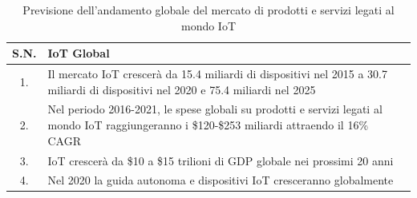 \begin{table}
	\begin{center}
	\begin{tabular}{|c|m{8cm}|}
		\hline
		\textbf{S.N.} & \textbf{IoT Global} \\
		\hline
		1. & Il mercato IoT crescerà da 15.4 miliardi di dispositivi nel 2015 a 30.7 miliardi di dispositivi nel 2020 e 75.4 miliardi nel 2025 \\
		\hline
		2. & Nel periodo 2016-2021, le spese globali su prodotti e servizi legati al mondo IoT raggiungeranno i \$120-\$253 miliardi attraendo il 16\% CAGR \\
		\hline
		3. & IoT crescerà da \$10 a \$15 trilioni di GDP globale nei prossimi 20 anni \\
		\hline
		4. & Nel 2020 la guida autonoma e dispositivi IoT cresceranno globalmente \\
		\hline
	\end{tabular}
\caption{Previsione dell'andamento globale del mercato di prodotti e servizi legati al mondo IoT \cite{famous:paper_indian_market}}
\label{tabel:market_global}
\end{center}
\end{table}






